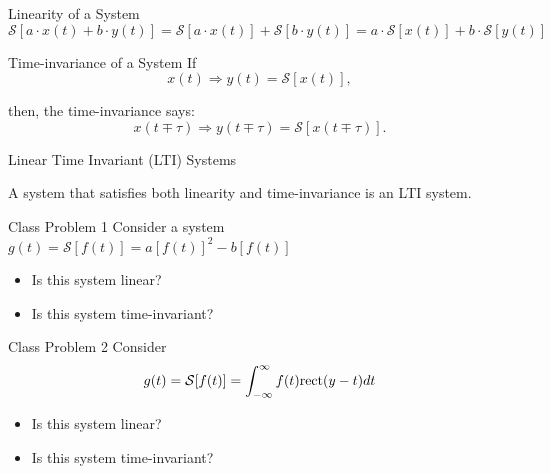 \documentclass[aspectratio=169,xcolor=dvipsnames,svgnames,x11names,fleqn]{beamer}
\begin{document}
\begin{frame}{Linearity of a System}
   \large
   \centering
   \begin{equation*}
\mathcal{S}[a \cdot x(t) + b \cdot y(t)] = \mathcal{S}[a \cdot x(t)] + \mathcal{S}[b \cdot y(t)] = a \cdot \mathcal{S}[x(t)] + b \cdot \mathcal{S}[y(t)]
\end{equation*}
\end{frame}

\begin{frame}{Time-invariance of a System}
     \large
   If
   \begin{equation*}
x(t) \Rightarrow y(t) = \mathcal{S}[x(t)],
\end{equation*}

then, the  time-invariance says:
\begin{equation*}
x(t \mp \tau) \Rightarrow y(t \mp \tau) = \mathcal{S}[x(t \mp \tau)].
\end{equation*}
\end{frame}

\begin{frame}{Linear Time Invariant (LTI) Systems}
    \begin{center}
        \bf \large 
        \begin{gradbox}{}
            A system that satisfies both linearity and time-invariance is an LTI system.
        \end{gradbox}
    \end{center}
\end{frame}

\begin{frame}{Class Problem 1}
    Consider a system 
    $g(t) = \mathcal{S}[f(t)] = a [f(t)]^2 - b [f(t)]$
    \begin{itemize}
        \item Is this system linear?
        \item Is this system time-invariant?
    \end{itemize}
\end{frame}

\begin{frame}{Class Problem 2}
    Consider 
    \begin{equation*}
        g(t) = {\mathcal S}[f(t)] = \int_{-\infty}^\infty  f(t)\textrm{rect}(y-t)dt
    \end{equation*}
    \begin{itemize}
        \item Is this system linear?
        \item Is this system time-invariant?
    \end{itemize}
\end{frame}
\end{document}
